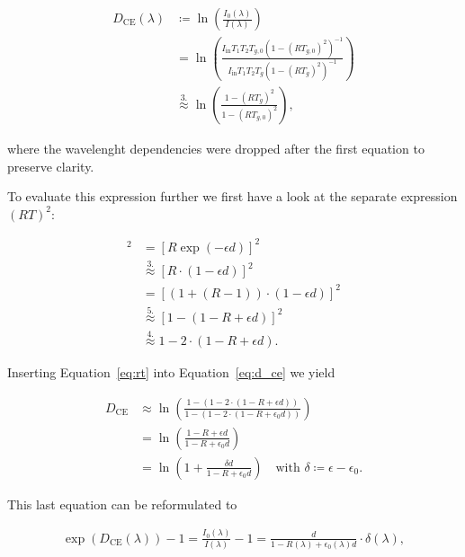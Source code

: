 \begin{align}
  D_{\text{CE}}(\lambda) & \coloneqq \ln\left(
                           \frac{I_0(\lambda)}{I(\lambda)}\right)\nonumber\\
                         & = \ln\left ( \frac{I_{\text{in}}T_1T_2T_{g,0}(1 -
                           (RT_{g,0})^2)^{-1}}{I_{\text{in}}T_1T_2T_g(1 -
                           (RT_g)^2)^{-1}}\right)\nonumber\\
                         & \stackrel{3.}{\approx} \ln\left( \frac{1 -
                           (RT_g)^2}{1 - (RT_{g,0})^2}\right)\label{eq:d_ce},
\end{align}

where the wavelenght dependencies were dropped after the first
equation to preserve clarity. 

To evaluate this expression further we
first have a look at the separate expression $(RT)^2$:

\begin{align}
  [RT]^2 & = [R \exp(-\epsilon d)]^2 \nonumber\\
         & \stackrel{3.}{\approx} [R \cdot(1 - \epsilon d)]^2 \nonumber\\
         & = [(1 + (R - 1))\cdot (1 - \epsilon d)]^2 \nonumber\\
         & \stackrel{5.}{\approx} [1 - (1 - R + \epsilon d)]^2 \nonumber\\
         & \stackrel{4.}{\approx} 1 - 2 \cdot (1 - R + \epsilon d)\label{eq:rt}.
\end{align}

Inserting Equation~\eqref{eq:rt} into Equation~\eqref{eq:d_ce} we
yield

\begin{align}
  D_{\text{CE}} & \approx \ln \left ( \frac{1 - (1 - 2\cdot ( 1- R +
  \epsilon d))}{1 - (1 - 2 \cdot (1 - R + \epsilon_0 d))}\right)\\
  & = \ln \left ( \frac{1 - R + \epsilon d}{1 - R + \epsilon_0
    d}\right) \\
  & = \ln \left ( 1 + \frac{ \delta d}{1 - R + \epsilon_0 d}\right) \quad
    \text{with } \delta \coloneqq \epsilon - \epsilon_0.
\end{align}

This last equation can be reformulated to

\begin{align}
  \exp(D_{\text{CE}}(\lambda)) - 1 = \frac{I_0(\lambda)}{I(\lambda)} -
  1 = \frac{d}{1 - R(\lambda) + \epsilon_0(\lambda) d} \cdot
  \delta(\lambda)\label{eq:i-1}, 
\end{align}

